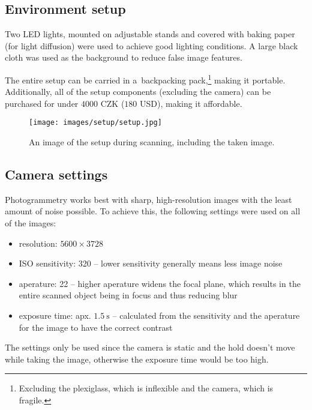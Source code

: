 \subsection{Environment setup}
Two LED lights, mounted on adjustable stands and covered with baking paper (for light diffusion) were used to achieve good lighting conditions.
A large black cloth was used as the background to reduce false image features.

The entire setup can be carried in a~backpacking pack,\footnote{Excluding the plexiglass, which is inflexible and the camera, which is fragile.} making it portable.
Additionally, all of the setup components (excluding the camera) can be purchased for under $4000$ CZK ($180$ USD), making it affordable.

\begin{figure}
	\centering
	\texttt{[image: images/setup/setup.jpg]}
	\caption{An image of the setup during scanning, including the taken image.}
	\label{fig:setup}
\end{figure}

\subsection{Camera settings}\label{sec:camsettings}
Photogrammetry works best with sharp, high-resolution images with the least amount of noise possible.
To achieve this, the following settings were used on all of the images:
\begin{itemize}
	\item resolution: $5600 \times 3728$
	\item ISO sensitivity: 320 -- lower sensitivity generally means less image noise
	\item aperature: 22 -- higher aperature widens the focal plane, which results in the entire scanned object being in focus and thus reducing blur
	\item exposure time: apx. $\SI{1.5}{\second}$ -- calculated from the sensitivity and the aperature for the image to have the correct contrast
\end{itemize}

The settings only be used since the camera is static and the hold doesn't move while taking the image, otherwise the exposure time would be too high.

